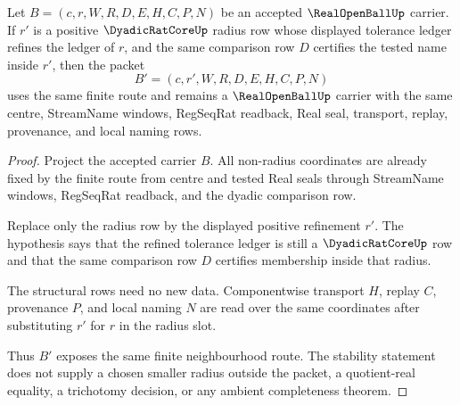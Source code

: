 \begin{theorem}
\label{thm:real-open-ball-dyadic-radius-stability}
Let $B=(c,r,W,R,D,E,H,C,P,N)$ be an accepted $\RealOpenBallUp$ carrier. If $r'$ is a positive $\DyadicRatCoreUp$ radius row whose displayed tolerance ledger refines the ledger of $r$, and the same comparison row $D$ certifies the tested name inside $r'$, then the packet
$$
B'=(c,r',W,R,D,E,H,C,P,N)
$$
uses the same finite route and remains a $\RealOpenBallUp$ carrier with the same centre, StreamName windows, RegSeqRat readback, Real seal, transport, replay, provenance, and local naming rows.
\end{theorem}
\begin{proof}
Project the accepted carrier $B$. All non-radius coordinates are already fixed by the finite route from centre and tested Real seals through StreamName windows, RegSeqRat readback, and the dyadic comparison row.

Replace only the radius row by the displayed positive refinement $r'$. The hypothesis says that the refined tolerance ledger is still a $\DyadicRatCoreUp$ row and that the same comparison row $D$ certifies membership inside that radius.

The structural rows need no new data. Componentwise transport $H$, replay $C$, provenance $P$, and local naming $N$ are read over the same coordinates after substituting $r'$ for $r$ in the radius slot.

Thus $B'$ exposes the same finite neighbourhood route. The stability statement does not supply a chosen smaller radius outside the packet, a quotient-real equality, a trichotomy decision, or any ambient completeness theorem.
\end{proof}

